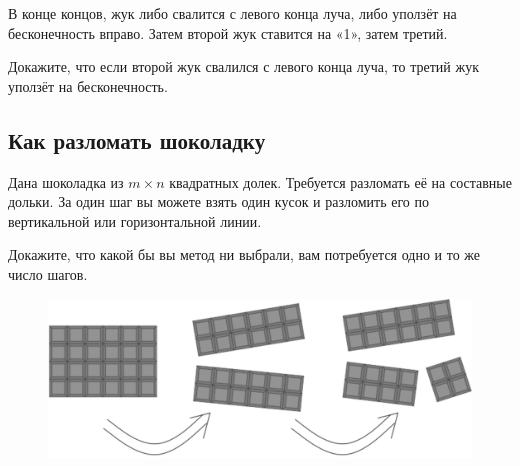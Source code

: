 В конце концов, жук либо свалится с левого конца луча, либо уползёт на бесконечность вправо.
Затем второй жук ставится на «1», затем третий.

Докажите, что если второй жук свалился с левого конца луча, то третий жук уползёт на бесконечность.

\subsection*{Как разломать шоколадку}%

Дана шоколадка из $m\times n$ квадратных долек. 
Требуется разломать её на составные дольки.
За один шаг вы можете взять один кусок и разломить его по вертикальной или горизонтальной линии.

Докажите, что какой бы вы метод ни выбрали, вам потребуется одно и то же  число шагов.

\begin{figure}[h!]
\centering
\includegraphics[scale=0.5]{Figs/Algorithms/bar}
\end{figure}
